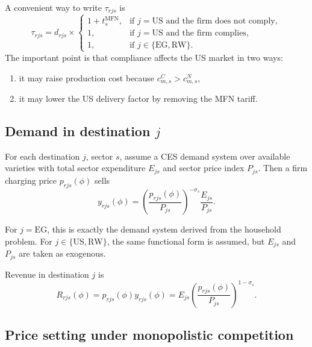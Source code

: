 \documentclass[11pt]{article}
\begin{document}
A convenient way to write \(\tau_{rjs}\) is
\begin{equation}
\tau_{rjs}=d_{rjs}\times
\begin{cases}
1+t_s^{\mathrm{MFN}}, & \text{if } j=\mathrm{US} \text{ and the firm does not comply},\\
1, & \text{if } j=\mathrm{US} \text{ and the firm complies},\\
1, & \text{if } j\in\{\mathrm{EG},\mathrm{RW}\}.
\end{cases}
\label{eq:tau_final}
\end{equation}
The important point is that compliance affects the US market in two ways:
\begin{enumerate}[leftmargin=*]
    \item it may raise production cost because \(c^C_{m,s}>c^N_{m,s}\),
    \item it may lower the US delivery factor by removing the MFN tariff.
\end{enumerate}

\subsection{Demand in destination \(j\)}

For each destination \(j\), sector \(s\), assume a CES demand system over available varieties with total sector expenditure \(E_{js}\) and sector price index \(P_{js}\). Then a firm charging price \(p_{rjs}(\phi)\) sells
\begin{equation}
y_{rjs}(\phi)=\left(\frac{p_{rjs}(\phi)}{P_{js}}\right)^{-\sigma_s}\frac{E_{js}}{P_{js}}.
\label{eq:demand_destination_final}
\end{equation}

For \(j=\mathrm{EG}\), this is exactly the demand system derived from the household problem. For \(j\in\{\mathrm{US},\mathrm{RW}\}\), the same functional form is assumed, but \(E_{js}\) and \(P_{js}\) are taken as exogenous.

Revenue in destination \(j\) is
\begin{equation}
R_{rjs}(\phi)=p_{rjs}(\phi)y_{rjs}(\phi)=E_{js}\left(\frac{p_{rjs}(\phi)}{P_{js}}\right)^{1-\sigma_s}.
\label{eq:revenue_destination_final}
\end{equation}

\subsection{Price setting under monopolistic competition}
\end{document}
